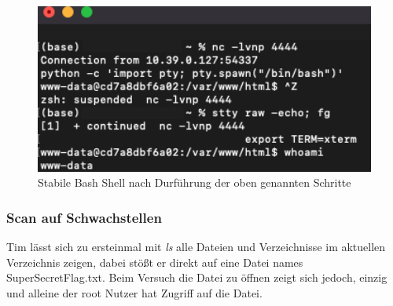\documentclass[10pt, a4paper,onecolumn ,titlepage]{article}
\begin{document}
    \begin{figure}[H]
        \centering
        \includegraphics[width=1\textwidth]{storyline_bilder_vm2/shellStabilisierenGanz}
        \caption{Stabile Bash Shell nach Durführung der oben genannten Schritte}
        \label{fig:shellStabilisiert}
    \end{figure}
    \noindent





    \subsubsection{Scan auf Schwachstellen}
    \label{subsubsec:privilegeEscalation}
    Tim lässt sich zu ersteinmal mit \textit{ls} alle Dateien und Verzeichnisse im aktuellen Verzeichnis zeigen, dabei stößt er direkt auf eine Datei names SuperSecretFlag.txt.
    Beim Versuch die Datei zu öffnen zeigt sich jedoch, einzig und alleine der root Nutzer hat Zugriff auf die Datei.
\end{document}
